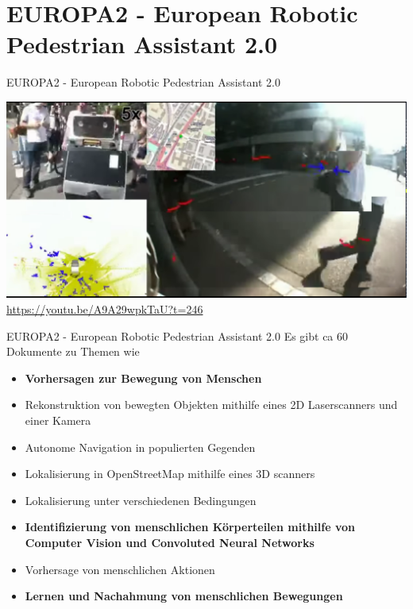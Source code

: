 \documentclass[aspectratio=1610]{beamer}
\begin{document}
  \section{EUROPA2 - European Robotic Pedestrian Assistant 2.0}
  \begin{frame}{EUROPA2 - European Robotic Pedestrian Assistant 2.0}
  	\begin{center}
  		\includegraphics[scale=0.15]{img/europa.png} \\
  		\url{https://youtu.be/A9A29wpkTaU?t=246}
  	\end{center}
  \end{frame}
  
  \begin{frame}{EUROPA2 - European Robotic Pedestrian Assistant 2.0}
  	Es gibt ca 60 Dokumente zu Themen wie
  	\begin{itemize}
  		\item \textbf{Vorhersagen zur Bewegung von Menschen}
  		\pause
  		\item Rekonstruktion von bewegten Objekten mithilfe eines 2D Laserscanners und einer Kamera
  		\pause
  		\item Autonome Navigation in populierten Gegenden
  		\pause
  		\item Lokalisierung in OpenStreetMap mithilfe eines 3D scanners
  		\pause
  		\item Lokalisierung unter verschiedenen Bedingungen
  		\pause
  		\item \textbf{Identifizierung von menschlichen Körperteilen mithilfe von Computer Vision und Convoluted Neural Networks}
  		\pause
  		\item Vorhersage von menschlichen Aktionen
  		\pause
  		\item \textbf{Lernen und Nachahmung von menschlichen Bewegungen}
  	\end{itemize}
  \end{frame}
  
\end{document}
